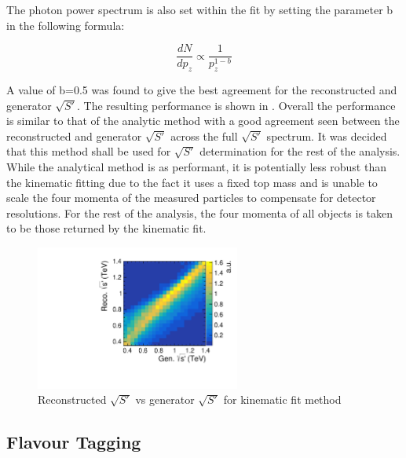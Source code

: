 The photon power spectrum is also set within the fit by setting the parameter b in the following formula:

\begin{equation}
\frac{dN}{dp_z}\propto\frac{1}{p_z^{1-b}}
\end{equation}

A value of b=0.5 was found to give the best agreement for the reconstructed and generator $\sqrt{S'}$. The resulting performance is shown in . Overall the performance is similar to that of the analytic method with a good agreement seen between the reconstructed and generator $\sqrt{S'}$ across the full $\sqrt{S'}$ spectrum. It was decided that this method shall be used for $\sqrt{S'}$ determination for the rest of the analysis. While the analytical method is as performant, it is potentially less robust than the kinematic fitting due to the fact it uses a fixed top mass and is unable to scale the four momenta of the measured particles to compensate for detector resolutions.  For the rest of the analysis, the four momenta of all objects is taken to be those returned by the kinematic fit.

\begin{figure}
  \centering
  \includegraphics[width=0.6\textwidth]{TopAnalysis/figures/KinEVsTrueE.pdf}
  \caption[Reconstructed $\sqrt{S'}$ vs generator $\sqrt{S'}$ for kinematic fit  method]{Reconstructed $\sqrt{S'}$ vs generator $\sqrt{S'}$ for kinematic fit method}
  \label{fig:KinFit}
\end{figure}

\subsection{Flavour Tagging}
\label{Flavour Tagging}

